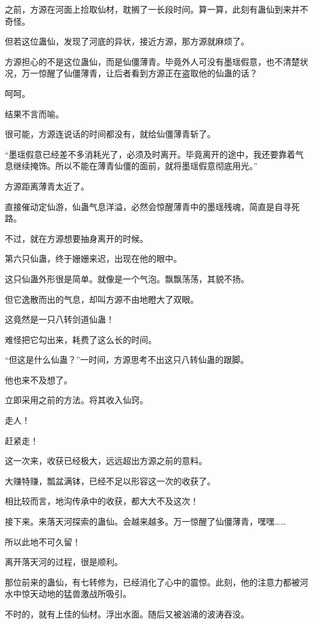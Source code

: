 \begin{this_body}
之前，方源在河面上捡取仙材，耽搁了一长段时间。算一算，此刻有蛊仙到来并不奇怪。

但若这位蛊仙，发现了河底的异状，接近方源，那方源就麻烦了。

方源担心的不是这位蛊仙，而是仙僵薄青。毕竟外人可没有墨瑶假意，也不清楚状况，万一惊醒了仙僵薄青，让后者看到方源正在盗取他的仙蛊的话？

呵呵。

结果不言而喻。

很可能，方源连说话的时间都没有，就给仙僵薄青斩了。

“墨瑶假意已经差不多消耗光了，必须及时离开。毕竟离开的途中，我还要靠着气息继续掩饰。所以不能在薄青仙僵的面前，就将墨瑶假意彻底用光。”

方源距离薄青太近了。

直接催动定仙游，仙蛊气息洋溢，必然会惊醒薄青中的墨瑶残魂，简直是自寻死路。

不过，就在方源想要抽身离开的时候。

第六只仙蛊，终于姗姗来迟，出现在他的眼中。

这只仙蛊外形很是简单。就像是一个气泡。飘飘荡荡，其貌不扬。

但它逸散而出的气息，却叫方源不由地瞪大了双眼。

这竟然是一只八转剑道仙蛊！

难怪把它勾出来，耗费了这么长的时间。

“但这是什么仙蛊？”一时间，方源思考不出这只八转仙蛊的跟脚。

他也来不及想了。

立即采用之前的方法。将其收入仙窍。

走人！

赶紧走！

这一次来，收获已经极大，远远超出方源之前的意料。

大赚特赚，瓢盆满钵，已经不足以形容这一次的收获了。

相比较而言，地沟传承中的收获，都大大不及这次！

接下来。来落天河探索的蛊仙。会越来越多。万一惊醒了仙僵薄青，嘿嘿……

所以此地不可久留！

离开落天河的过程，很是顺利。

那位前来的蛊仙，有七转修为，已经消化了心中的震惊。此刻，他的注意力都被河水中惊天动地的猛兽激战所吸引。

不时的，就有上佳的仙材。浮出水面。随后又被汹涌的波涛吞没。


\end{this_body}
